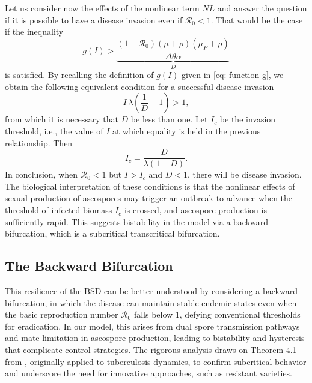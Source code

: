 \documentclass[11pt]{article}
\numberwithin{equation}{section}
\begin{document}
Let us consider now the effects of the nonlinear term $NL$ and answer the question if it is possible to have a disease invasion even if $\mathcal{R}_0<1$.
That would be the case if the inequality
\begin{equation}
    g(I)>\underbrace{\frac{(1-\mathcal{R}_0)(\mu+\rho)(\mu_P+\rho)}{\Delta\theta\alpha }}_{D}
\end{equation}
is satisfied. By recalling the definition of $g(I)$ given in \eqref{eq: function g}, we obtain the following equivalent condition for a successful disease invasion
\begin{equation}
    I \,\lambda \left(\frac{1}{D}-1\right)>1,
\end{equation}
from which it is necessary that $D$ be less than one. Let $I_c$ be the invasion threshold, i.e., the value of $I$ at which equality is held in the previous relationship. Then
\begin{equation}
    I_c=\frac{D}{\lambda(1-D)}.
\end{equation}
In conclusion, when $\mathcal{R}_0<1$ but $I>I_c$ and $D<1$, there will be disease invasion. 
The biological interpretation of these conditions is that the nonlinear effects of sexual production of ascospores may trigger an outbreak to advance when the threshold of infected biomass $I_c$ is crossed, and ascospore production is sufficiently rapid. This suggests bistability in the model via a backward bifurcation, which is a subcritical transcritical bifurcation.

\subsection{The Backward Bifurcation}
This resilience of the BSD can be better understood by considering a backward bifurcation, in which the disease can maintain stable endemic states even when the basic reproduction number $\mathcal{R}_0$ falls below 1, defying conventional thresholds for eradication. 
In our model, this arises from dual spore transmission pathways and mate limitation in ascospore production, leading to bistability and hysteresis that complicate control strategies. The rigorous analysis draws on Theorem 4.1 from \cite{castillo}, originally applied to tuberculosis dynamics, to confirm subcritical behavior and underscore the need for innovative approaches, such as resistant varieties.
\end{document}
